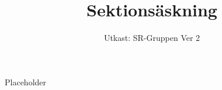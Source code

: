 \documentclass[a4paper]{dtek}
\title{Sektionsäskning}
\date{Utkast: SR-Gruppen Ver 2}
\begin{document}
Placeholder
\end{document}
